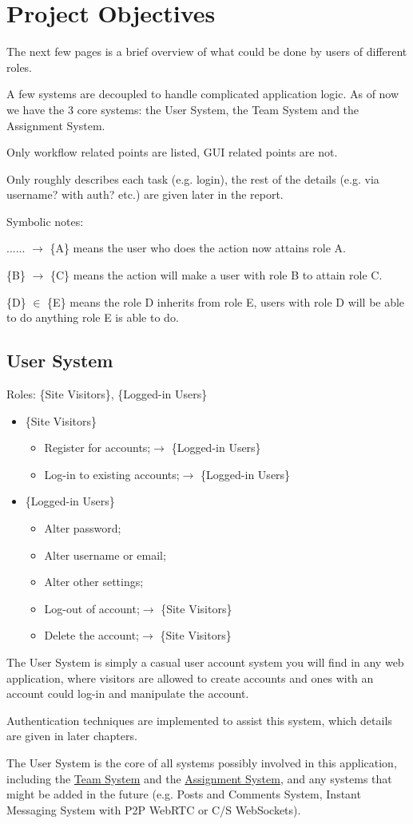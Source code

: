 \documentclass[12pt]{report}
\newcommand{\n}{\par}
\newcommand{\br}{\vspace{1 em}\n}
\begin{document}
\section{Project Objectives} \label{overview.project-objectives}
The next few pages is a brief overview of what could be done by users of different roles.\n
A few systems are decoupled to handle complicated application logic.
As of now we have the 3 core systems: the User System, the Team System and the Assignment System.
\br
Only workflow related points are listed, GUI related points are not.\n
Only roughly describes each task (e.g. login),
the rest of the details (e.g. via username? with auth? etc.) are given later in the report.
\br
Symbolic notes:\n
...... $\rightarrow$ \{A\} means the user who does the action now attains role A.\n
\{B\} $\rightarrow$ \{C\} means the action will make a user with role B to attain role C.\n
\{D\} $\in$ \{E\} means the role D inherits from role E, users with role D will be able to do anything role E is able to do.
\newpage

\subsection{User System} \label{overview.project-objectives.user-system}
Roles: \{Site Visitors\}, \{Logged-in Users\}\n
\begin{itemize}
	\item \{Site Visitors\}
	      \begin{itemize}
		      \item Register for accounts;\null\hfill $\rightarrow$ \{Logged-in Users\}
		      \item Log-in to existing accounts;\null\hfill $\rightarrow$ \{Logged-in Users\}
	      \end{itemize}
	\item \{Logged-in Users\}
	      \begin{itemize}
		      \item Alter password;
		      \item Alter username or email;
		      \item Alter other settings;
		      \item Log-out of account;\null\hfill $\rightarrow$ \{Site Visitors\}
		      \item Delete the account;\null\hfill $\rightarrow$ \{Site Visitors\}
	      \end{itemize}
\end{itemize}\n
The User System is simply a casual user account system you will find in any web application,
where visitors are allowed to create accounts and ones with an account could log-in and manipulate the account.
\br
Authentication techniques are implemented to assist this system, which details are given in later chapters.
\br
The User System is the core of all systems possibly involved in this application,
including the \hyperref[overview.project-objectives.team-system]{Team System}
and the \hyperref[overview.project-objectives.assignment-system]{Assignment System},
and any systems that might be added in the future (e.g. Posts and Comments System, Instant Messaging System with P2P WebRTC or C/S WebSockets).
\newpage
\end{document}

